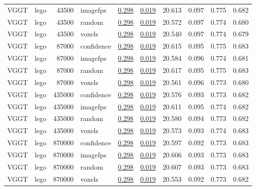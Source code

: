 \begin{table}[H]
\begin{tabular}{llrlrrrrrr}
VGGT & lego & 43500 & imagefps & \underline{0.298} & \underline{0.019} & 20.613 & 0.097 & 0.775 & 0.682 \\
VGGT & lego & 43500 & random & \underline{0.298} & \underline{0.019} & 20.572 & 0.097 & 0.774 & 0.680 \\
VGGT & lego & 43500 & voxels & \underline{0.298} & \underline{0.019} & 20.540 & 0.097 & 0.774 & 0.679 \\
VGGT & lego & 87000 & confidence & \underline{0.298} & \underline{0.019} & 20.615 & 0.095 & 0.775 & 0.683 \\
VGGT & lego & 87000 & imagefps & \underline{0.298} & \underline{0.019} & 20.584 & 0.096 & 0.774 & 0.681 \\
VGGT & lego & 87000 & random & \underline{0.298} & \underline{0.019} & 20.617 & 0.095 & 0.775 & 0.683 \\
VGGT & lego & 87000 & voxels & \underline{0.298} & \underline{0.019} & 20.561 & 0.096 & 0.773 & 0.680 \\
VGGT & lego & 435000 & confidence & \underline{0.298} & \underline{0.019} & 20.576 & 0.093 & 0.773 & 0.682 \\
VGGT & lego & 435000 & imagefps & \underline{0.298} & \underline{0.019} & 20.611 & 0.095 & 0.774 & 0.682 \\
VGGT & lego & 435000 & random & \underline{0.298} & \underline{0.019} & 20.580 & 0.094 & 0.773 & 0.682 \\
VGGT & lego & 435000 & voxels & \underline{0.298} & \underline{0.019} & 20.573 & 0.093 & 0.774 & 0.683 \\
VGGT & lego & 870000 & confidence & \underline{0.298} & \underline{0.019} & 20.597 & 0.092 & 0.773 & 0.683 \\
VGGT & lego & 870000 & imagefps & \underline{0.298} & \underline{0.019} & 20.606 & 0.093 & 0.773 & 0.683 \\
VGGT & lego & 870000 & random & \underline{0.298} & \underline{0.019} & 20.607 & 0.093 & 0.773 & 0.683 \\
VGGT & lego & 870000 & voxels & \underline{0.298} & \underline{0.019} & 20.553 & 0.092 & 0.773 & 0.682 \\
\bottomrule
\end{tabular}
\end{table}